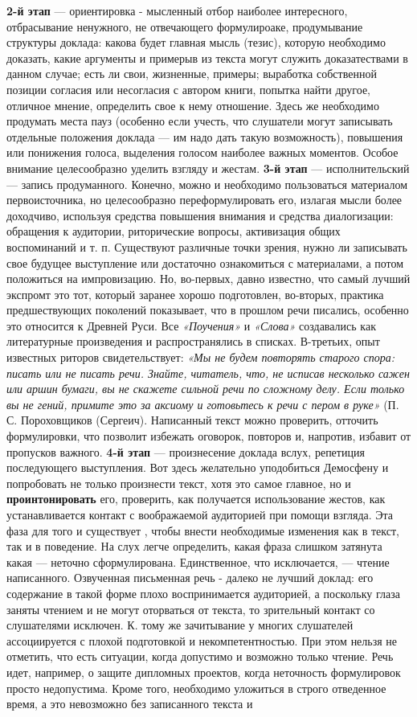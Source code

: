 {{ \textbf{2-й этап} — ориентировка - мысленный отбор наиболее интересного, отбрасывание ненужного, не отвечающего формулироаке, продумывание структуры доклада: какова будет главная мысль (тезис), которую необходимо доказать, какие аргументы и примерыв из текста могут служить доказатествами в данном случае; есть ли свои, жизненные, примеры; выработка собственной позиции согласия или несогласия с автором  книги, попытка найти другое, отличное мнение, определить свое к нему отношение. Здесь же необходимо продумать места пауз (особенно если учесть, что слушатели могут записывать отдельные положения доклада — им надо дать такую возможность), повышения или понижения голоса, выделения голосом наиболее важных моментов. Особое внимание целесообразно уделить взгляду и жестам. 
 \textbf{3-й этап} — исполнительский — запись продуманного. Конечно, можно и необходимо пользоваться материалом первоисточника, но целесообразно переформулировать его, излагая мысли более доходчиво, используя средства повышения внимания и средства диалогизации: обращения к аудитории, риторические вопросы, активизация общих воспоминаний и т. п. Существуют различные точки зрения, нужно ли записывать свое будущее выступление или достаточно ознакомиться с материалами, а потом положиться на импровизацию. Но, во-первых, давно известно, что самый лучший экспромт это тот, который заранее хорошо подготовлен, во-вторых, практика предшествующих поколений показывает, что в прошлом речи писались, особенно это относится к Древней Руси. Все \textit{«Поучения»} и \textit{«Слова»} создавались как литературные произведения и распространялись в списках. В-третьих, опыт известных риторов свидетельствует: \textit{«Мы не будем повторять старого спора: писать или не писать речи. Знайте, читатель, что, не исписав несколько сажен или аршин бумаги, вы не скажете сильной речи по сложному делу. Если только вы не гений, примите это за аксиому и готовьтесь к речи с пером в руке»} (П. С. Пороховщиков (Сергеич). Написанный текст можно проверить, отточить формулировки, что позволит избежать оговорок, повторов и, напротив, избавит от пропусков важного. \textbf{4-й этап} — произнесение доклада вслух, репетиция последующего выступления. Вот здесь желательно уподобиться Демосфену и попробовать не только произнести текст, хотя это самое главное, но и \textbf{проинтонировать} его, проверить, как получается использование жестов, как устанавливается контакт с воображаемой аудиторией при помощи взгляда. Эта фаза для того и существует , чтобы внести необходимые изменения как в текст, так и в поведение. На слух легче определить, какая фраза слишком затянута какая — неточно сформулирована. Единственное, что исключается, — чтение написанного. Озвученная письменная речь - далеко не лучший доклад: его содержание в такой форме плохо воспринимается аудиторией, а поскольку глаза заняты чтением и не могут оторваться от текста, то зрительный контакт со  слушателями исключен. К. тому же зачитывание у многих слушателей ассоциируется с плохой подготовкой и некомпетентностью. При этом нельзя не отметить, что есть ситуации, когда допустимо и возможно только чтение. Речь идет, например, о защите дипломных проектов, когда неточность формулировок просто недопустима. Кроме того, необходимо уложиться в строго отведенное время, а это невозможно без записанного текста и }}

